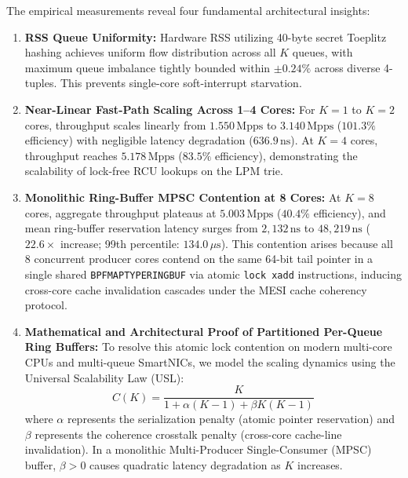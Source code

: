 \documentclass{ieeeaccess}
\renewcommand{\_}{\textunderscore\allowbreak}
\begin{document}
The empirical measurements reveal four fundamental architectural insights:
\begin{enumerate}
  \item \textbf{RSS Queue Uniformity:} Hardware RSS utilizing 40-byte secret Toeplitz hashing achieves uniform flow distribution across all $K$ queues, with maximum queue imbalance tightly bounded within $\pm 0.24\%$ across diverse 4-tuples. This prevents single-core soft-interrupt starvation.
  \item \textbf{Near-Linear Fast-Path Scaling Across 1--4 Cores:} For $K=1$ to $K=2$ cores, throughput scales linearly from $1.550\,\text{Mpps}$ to $3.140\,\text{Mpps}$ ($101.3\%$ efficiency) with negligible latency degradation ($636.9\,\text{ns}$). At $K=4$ cores, throughput reaches $5.178\,\text{Mpps}$ ($83.5\%$ efficiency), demonstrating the scalability of lock-free RCU lookups on the LPM trie.
  \item \textbf{Monolithic Ring-Buffer MPSC Contention at 8 Cores:} At $K=8$ cores, aggregate throughput plateaus at $5.003\,\text{Mpps}$ ($40.4\%$ efficiency), and mean ring-buffer reservation latency surges from $2{,}132\,\text{ns}$ to $48{,}219\,\text{ns}$ ($22.6\times$ increase; 99th percentile: $134.0\,\mu\text{s}$). This contention arises because all 8 concurrent producer cores contend on the same 64-bit tail pointer in a single shared \texttt{BPF\_MAP\_TYPE\_RINGBUF} via atomic \texttt{lock xadd} instructions, inducing cross-core cache invalidation cascades under the MESI cache coherency protocol.
  \item \textbf{Mathematical and Architectural Proof of Partitioned Per-Queue Ring Buffers:}
  To resolve this atomic lock contention on modern multi-core CPUs and multi-queue SmartNICs, we model the scaling dynamics using the Universal Scalability Law (USL):
  \begin{equation}
    C(K) = \frac{K}{1 + \alpha(K-1) + \beta K(K-1)}
    \label{eq:usl}
  \end{equation}
  where $\alpha$ represents the serialization penalty (atomic pointer reservation) and $\beta$ represents the coherence crosstalk penalty (cross-core cache-line invalidation). In a monolithic Multi-Producer Single-Consumer (MPSC) buffer, $\beta > 0$ causes quadratic latency degradation as $K$ increases.


\end{enumerate}
\end{document}
